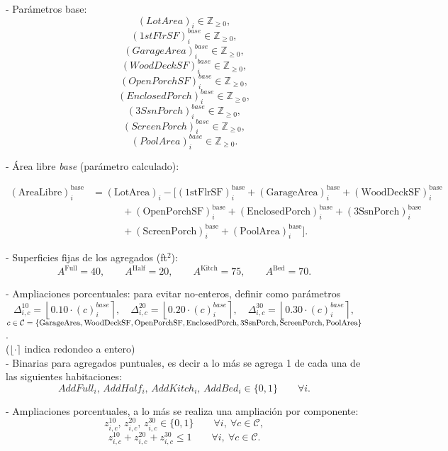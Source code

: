 \begin{itemize}
- Parámetros base:
\[
(LotArea)_i \in \mathbb{Z}_{\ge 0},
\]
\[
(1stFlrSF)_i^{base} \in \mathbb{Z}_{\ge 0},
\]
\[
(GarageArea)_i^{base} \in \mathbb{Z}_{\ge 0},
\]
\[
(WoodDeckSF)_i^{base} \in \mathbb{Z}_{\ge 0},
\]
\[
(OpenPorchSF)_i^{base} \in \mathbb{Z}_{\ge 0},
\]
\[
(EnclosedPorch)_i^{base} \in \mathbb{Z}_{\ge 0},
\]
\[
(3SsnPorch)_i^{base} \in \mathbb{Z}_{\ge 0},
\]
\[
(ScreenPorch)_i^{base} \in \mathbb{Z}_{\ge 0},
\]
\[
(PoolArea)_i^{base} \in \mathbb{Z}_{\ge 0}.
\]

- Área libre \emph{base} (parámetro calculado):

\begin{align*}
(\mathrm{AreaLibre})_i^{\mathrm{base}}
  &= (\mathrm{LotArea})_i
   - \Big[ (\mathrm{1stFlrSF})_i^{\mathrm{base}}
   + (\mathrm{GarageArea})_i^{\mathrm{base}}
   + (\mathrm{WoodDeckSF})_i^{\mathrm{base}} \\[-2pt]
  &\qquad\quad
   + (\mathrm{OpenPorchSF})_i^{\mathrm{base}}
   + (\mathrm{EnclosedPorch})_i^{\mathrm{base}}
   + (3\mathrm{SsnPorch})_i^{\mathrm{base}} \\[-2pt]
  &\qquad\quad
   + (\mathrm{ScreenPorch})_i^{\mathrm{base}}
   + (\mathrm{PoolArea})_i^{\mathrm{base}}
   \Big].
\end{align*}

- Superficies fijas de los agregados (ft\(^2\)):
\[
A^{\text{Full}}=40,\qquad A^{\text{Half}}=20,\qquad A^{\text{Kitch}}=75,\qquad A^{\text{Bed}}=70.
\]

- Ampliaciones porcentuales: para evitar no-enteros,
definir como parámetros
\[
\Delta^{10}_{i,c}=\left\lfloor0.10\cdot (c)_i^{base}\right\rceil,\quad
\Delta^{20}_{i,c}=\left\lfloor0.20\cdot (c)_i^{base}\right\rceil,\quad
\Delta^{30}_{i,c}=\left\lfloor0.30\cdot (c)_i^{base}\right\rceil,
\]
 \(c\in\mathcal{C}=\{\text{GarageArea},\text{WoodDeckSF},\text{OpenPorchSF},\text{EnclosedPorch},\\
\text{3SsnPorch},\text{ScreenPorch},\text{PoolArea}\}\).\\
(\(\lfloor\cdot\rceil\) indica redondeo a entero)\\

- Binarias para agregados puntuales, es decir a lo más se agrega 1 de cada una de las siguientes habitaciones:
\[
AddFull_i,\, AddHalf_i,\, AddKitch_i,\, AddBed_i \in \{0,1\} \qquad \forall i.
\]

- Ampliaciones porcentuales, a lo más se realiza una ampliación por componente:
\[
z^{10}_{i,c},\, z^{20}_{i,c},\, z^{30}_{i,c} \in \{0,1\} \qquad \forall i,\ \forall c\in\mathcal{C},
\]
\[
z^{10}_{i,c}+z^{20}_{i,c}+z^{30}_{i,c} \le 1 \qquad \forall i,\ \forall c\in\mathcal{C}.
\]


\end{itemize}
